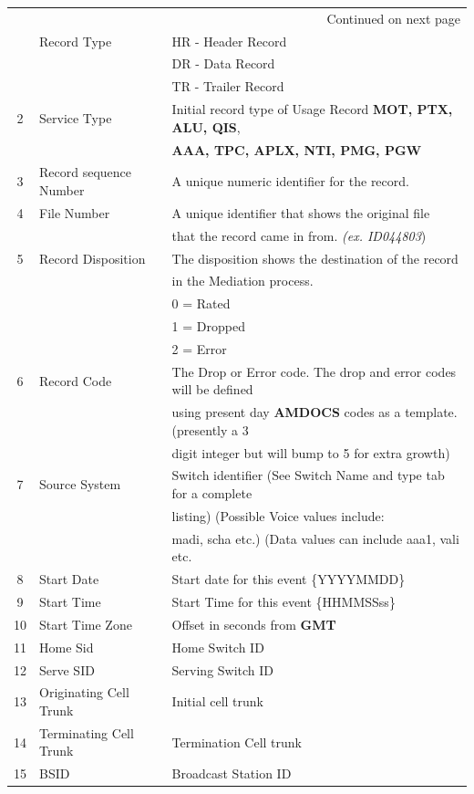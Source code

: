 \documentclass[12pt,twoside]{article}
\begin{document}
\begin{longtable}{c|l|l}
\hline
\endhead
\hline\multicolumn{3}{r}{Continued on next page} \\
\endfoot
\endlastfoot
\hline
1 & Record Type & HR - Header Record\\
 &  & DR - Data Record\\
 &  & TR - Trailer Record\\
2 & Service Type & Initial record type of Usage Record \textbf{MOT, PTX, ALU, QIS},\\
 &  & \textbf{AAA, TPC, APLX, NTI, PMG, PGW}\\
3 & Record sequence Number & A unique numeric identifier for the record.\\
4 & File Number & A unique identifier that shows the original file\\
 &  & that the record came in from. \emph{(ex. ID044803})\\
5 & Record Disposition & The disposition shows the destination of the record\\
 &  & in the Mediation process.\\
 &  & 0 = Rated\\
 &  & 1 = Dropped\\
 &  & 2 = Error\\
6 & Record Code & The Drop or Error code. The drop and error codes will be defined\\
 &  & using present day \textbf{AMDOCS} codes as a template. (presently a 3\\
 &  & digit integer but will bump to 5 for extra growth)\\
7 & Source System & Switch identifier (See Switch Name and type tab for a complete\\
 &  & listing) (Possible Voice values include:\\
 &  & madi, scha etc.) (Data values can include aaa1, vali etc.\\
8 & Start Date & Start date for this event \{YYYYMMDD\}\\
9 & Start Time & Start Time for this event \{HHMMSSss\}\\
10 & Start Time Zone & Offset in seconds from \textbf{GMT}\\
11 & Home Sid & Home Switch ID\\
12 & Serve SID & Serving Switch ID\\
13 & Originating Cell Trunk & Initial cell trunk\\
14 & Terminating Cell Trunk & Termination Cell trunk\\
15 & BSID & Broadcast Station ID\\

\end{longtable}
\end{document}
